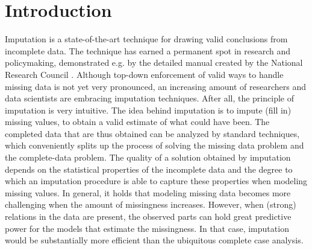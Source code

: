 \documentclass[bimj,fleqn]{w-art}
\begin{document}
\maketitle          %







\section{Introduction}

Imputation is a state-of-the-art technique for drawing valid conclusions from incomplete data. The technique has earned a permanent spot in research and policymaking, demonstrated e.g. by the detailed manual created by the National Research Council \citep*{little2012prevention}. Although top-down enforcement of valid ways to handle missing data is not yet very pronounced, an increasing amount of researchers and data scientists are embracing imputation techniques. After all, the principle of imputation is very intuitive. The idea behind imputation is to impute (fill in) missing values, to obtain a valid estimate of what could have been. The completed data that are thus obtained can be analyzed by standard techniques, which conveniently splits up the process of solving the missing data problem and the complete-data problem. The quality of a solution obtained by imputation depends on the statistical properties of the incomplete data and the degree to which an imputation procedure is able to capture these properties when modeling missing values. In general, it holds that modeling missing data becomes more challenging when the amount of missingness increases. However, when (strong) relations in the data are present, the observed parts can hold great predictive power for the models that estimate the missingness. In that case, imputation would be substantially more efficient than the ubiquitous complete case analysis.
\end{document}
